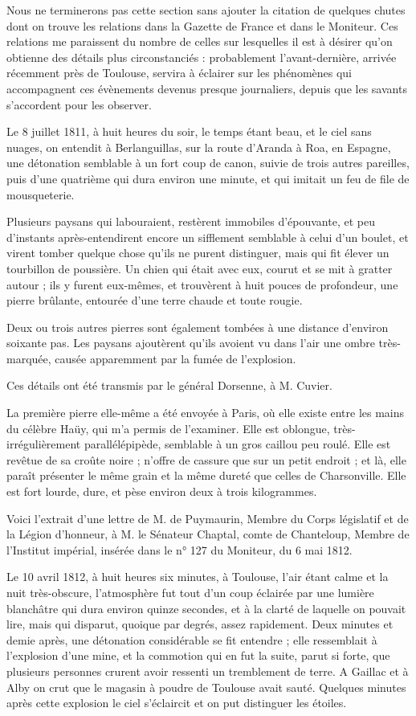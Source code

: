 \documentclass[a4paper, 12pt, oneside, french]{article}
\begin{document}
Nous ne terminerons pas cette section sans ajouter la citation de quelques chutes dont on trouve les relations dans la Gazette de France et dans le Moniteur. Ces relations me paraissent du nombre de celles sur lesquelles il est à désirer qu'on obtienne des détails plus circonstanciés : probablement l'avant-dernière, arrivée récemment près de Toulouse, servira à éclairer sur les phénomènes qui accompagnent ces évènements devenus presque journaliers, depuis que les savants s'accordent pour les observer.

Le 8 juillet 1811, à huit heures du soir, le temps étant beau, et le ciel sans nuages, on entendit à Berlanguillas, sur la route d'Aranda à Roa, en Espagne, une détonation semblable à un fort coup de canon, suivie de trois autres pareilles, puis d'une quatrième qui dura environ une minute, et qui imitait un feu de file de mousqueterie.

Plusieurs paysans qui labouraient, restèrent immobiles d'épouvante, et peu d'instants après-entendirent encore un sifflement semblable à celui d'un boulet, et virent tomber quelque chose qu'ils ne purent distinguer, mais qui fit élever un tourbillon de poussière. Un chien qui était avec eux, courut et se mit à gratter autour ; ils y furent eux-mêmes, et trouvèrent à huit pouces de profondeur, une pierre brûlante, entourée d'une terre chaude et toute rougie.

Deux ou trois autres pierres sont également tombées à une distance d'environ soixante pas. Les paysans ajoutèrent qu'ils avoient vu dans l'air une ombre très-marquée, causée apparemment par la fumée de l'explosion.

Ces détails ont été transmis par le général Dorsenne, à M. Cuvier.

La première pierre elle-même a été envoyée à Paris, où elle existe entre les mains du célèbre Haüy, qui m'a permis de l'examiner. Elle est oblongue, très-irrégulièrement parallélépipède, semblable à un gros caillou peu roulé. Elle est revêtue de sa croûte noire ; n'offre de cassure que sur un petit endroit ; et là, elle paraît présenter le même grain et la même dureté que celles de Charsonville. Elle est fort lourde, dure, et pèse environ deux à trois kilogrammes.

Voici l'extrait d'une lettre de M. de Puymaurin, Membre du Corps législatif et de la Légion d'honneur, à M. le Sénateur Chaptal, comte de Chanteloup, Membre de l'Institut impérial, insérée dans le n° 127 du Moniteur, du 6 mai 1812.

\og Le 10 avril 1812, à huit heures six minutes, à Toulouse, l'air étant calme et la nuit très-obscure, l'atmosphère fut tout d'un coup éclairée par une lumière blanchâtre qui dura environ quinze secondes, et à la clarté de laquelle on pouvait lire, mais qui disparut, quoique par degrés, assez rapidement. Deux minutes et demie après, une détonation considérable se fit entendre ; elle ressemblait à l'explosion d'une mine, et la commotion qui en fut la suite, parut si forte, que plusieurs personnes crurent avoir ressenti un tremblement de terre. A Gaillac et à Alby on crut que le magasin à poudre de Toulouse avait sauté. Quelques minutes après cette explosion le ciel s'éclaircit et on put distinguer les étoiles. \fg
\end{document}
